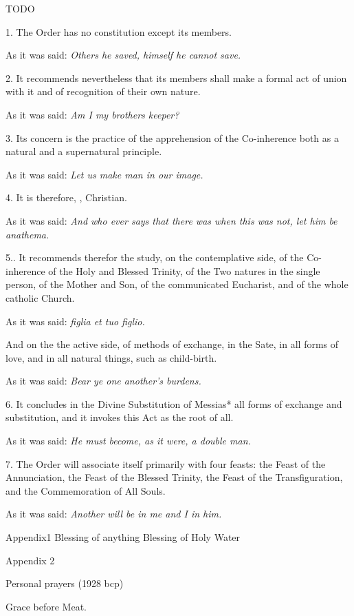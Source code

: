 TODO

1. The Order has no constitution except its members.

As it was said: \emph{Others he saved, himself he cannot save.}

2. It recommends nevertheless that its members shall make a formal act of union with it and of recognition of their own nature.

As it was said: \emph{Am I my brothers keeper?}

3. Its concern is the practice of the apprehension of the Co-inherence both as a natural and a supernatural principle.

As it was said: \emph{Let us make man in our image.}

4. It is therefore, , Christian.

As it was said: \emph{And who ever says that there was when this was not, let him be anathema.}

5.. It recommends therefor the study, on the contemplative side, of the Co-inherence of the Holy and Blessed Trinity, of the Two natures in the single person, of the Mother and Son, of the communicated Eucharist, and of the whole catholic Church.

As it was said: \emph{figlia et tuo figlio.}

And on the the active side, of methods of exchange, in the Sate, in all forms of love, and in all natural things, such as child-birth.

As it was said: \emph{Bear ye one another's burdens.}

6. It concludes in the Divine Substitution of Messias* all forms of exchange and substitution, and it invokes this Act as the root of all.

As it was said: \emph{He must become, as it were, a double man.}

7. The Order will associate itself primarily with four feasts: the Feast of the Annunciation, the Feast of the Blessed Trinity, the Feast of the Transfiguration, and the Commemoration of All Souls.

As it was said: \emph{Another will be in me and I in him.}





Appendix1
Blessing of anything
Blessing of Holy Water

Appendix 2

Personal prayers (1928 bcp)


Grace before Meat.

